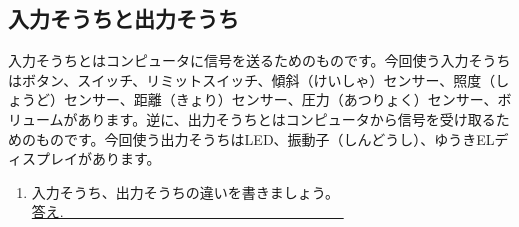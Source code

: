 \subsection{入力そうちと出力そうち}
入力そうちとはコンピュータに信号を送るためのものです。今回使う入力そうちはボタン、スイッチ、リミットスイッチ、傾斜（けいしゃ）センサー、照度（しょうど）センサー、距離（きょり）センサー、圧力（あつりょく）センサー、ボリュームがあります。逆に、出力そうちとはコンピュータから信号を受け取るためのものです。今回使う出力そうちはLED、振動子（しんどうし）、ゆうきELディスプレイがあります。\\
\begin{tcolorbox}[title=\useOmetoi]
\begin{enumerate}
\item 入力そうち、出力そうちの違いを書きましょう。\\
\underline{答え.　　　　　　　　　　　　　　　　　　　　}
\end{enumerate}
\end{tcolorbox}













